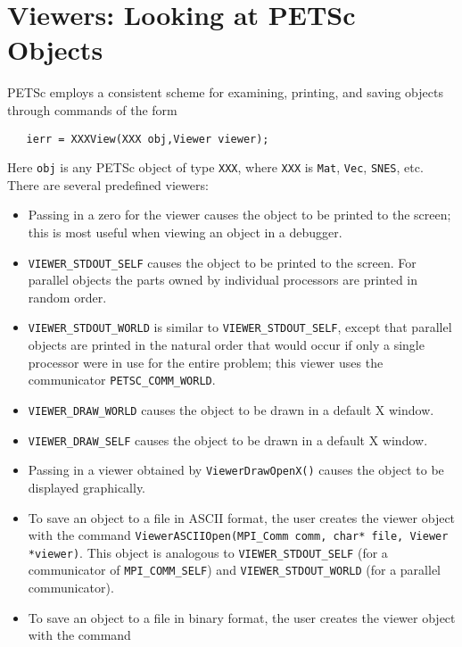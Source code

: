 {\section{Viewers: Looking at PETSc Objects} \label{sec:viewers}

PETSc employs a consistent scheme for examining, printing, and 
saving objects through commands of the form
\begin{verbatim}
   ierr = XXXView(XXX obj,Viewer viewer);
\end{verbatim}
Here {\tt obj} is any PETSc object of type
{\tt XXX},  where {\tt XXX} 
is {\tt Mat}, {\tt Vec}, {\tt SNES}, etc. There are several
predefined viewers:
\begin{itemize}
\item Passing in a zero for the viewer causes the object to be printed 
      to the screen; this is most useful when viewing an object in 
      a debugger.
\item {\tt VIEWER\_STDOUT\_SELF} 
      causes the object to be printed to the screen.
      For parallel objects the parts owned by individual processors are 
      printed in random order.
\item {\tt VIEWER\_STDOUT\_WORLD} 
      is similar to {\tt VIEWER\_STDOUT\_SELF}, except that 
      parallel objects are printed in the natural order that would occur
      if only a single processor were in use for the entire problem;
      this viewer uses the communicator {\tt PETSC\_COMM\_WORLD}.
\item {\tt VIEWER\_DRAW\_WORLD}  causes the 
      object to be drawn in a default X window.
\item {\tt VIEWER\_DRAW\_SELF}  causes the 
      object to be drawn in a default X window.
\item Passing in a viewer obtained by
      {\tt ViewerDrawOpenX()} causes the object to be displayed graphically.
\item To save an object to a file in ASCII format, the user creates
      the viewer object with the command
      {\tt ViewerASCIIOpen(MPI\_Comm comm, char* file, Viewer *viewer)}.  
      This object is 
      analogous to {\tt VIEWER\_STDOUT\_SELF} (for a communicator of
      {\tt MPI\_COMM\_SELF}) and 
      {\tt VIEWER\_STDOUT\_WORLD} (for a parallel communicator).
\item To save an object to a file in binary format, the user creates
      the viewer object with the command

\end{itemize}}
